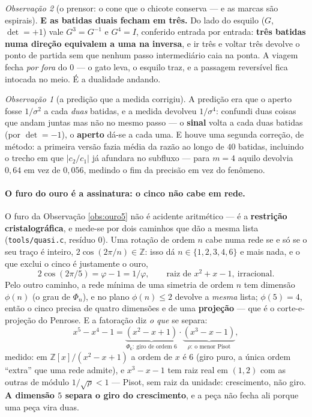 \documentclass[11pt]{article}
\newcommand{\code}[1]{\texttt{\small #1}}
\newcommand{\Z}{\mathbb Z}
\theoremstyle{plain}
\theoremstyle{remark}
\newtheorem{obs}{Observação}
\begin{document}
\begin{obs}[o prensor: o cone que o chicote conserva --- e as marcas são espirais]
\textbf{E as batidas duais fecham em três.} Do lado do esquilo ($G$, $\det=+1$) vale $G^3=G^{-1}$ e
$G^4=I$, conferido entrada por entrada: \textbf{três batidas numa direção equivalem a uma na
inversa}, e ir três e voltar três devolve o ponto de partida sem que nenhum passo intermediário caia
na ponta. A viagem fecha \emph{por fora} do $0$ --- o gato leva, o esquilo traz, e a passagem
reversível fica intocada no meio. É a dualidade andando.

\begin{obs}[a predição que a medida corrigiu]
A predição era que o aperto fosse $1/\sigma^{2}$ a cada \emph{duas} batidas, e a medida devolveu
$1/\sigma^{4}$: confundi duas coisas que andam juntas mas não no mesmo passo --- o \textbf{sinal}
volta a cada duas batidas (por $\det=-1$), o \textbf{aperto} dá-se a cada uma. E houve uma segunda
correção, de método: a primeira versão fazia média da razão ao longo de $40$ batidas, incluindo o
trecho em que $|c_2/c_1|$ já afundara no subfluxo --- para $m=4$ aquilo devolvia $0{,}64$ em vez de
$0{,}056$, medindo o fim da precisão em vez do fenômeno.
\end{obs}
\end{obs}

\paragraph{O furo do ouro é a assinatura: o cinco não cabe em rede.} O furo da Observação
\ref{obs:ouro5} não é acidente aritmético --- é a \textbf{restrição cristalográfica}, e mede-se por
dois caminhos que dão a mesma lista (\code{tools/quasi.c}, resíduo $0$). Uma rotação de ordem $n$ cabe
numa rede se e só se o seu traço é inteiro, $2\cos(2\pi/n)\in\Z$: isso dá $n\in\{1,2,3,4,6\}$ e mais
nada, e o que exclui o cinco é justamente o ouro,
\[
 2\cos(2\pi/5)=\varphi-1=1/\varphi,\qquad\text{raiz de }x^2+x-1,\ \text{irracional.}
\]
Pelo outro caminho, a rede mínima de uma simetria de ordem $n$ tem dimensão $\phi(n)$ (o grau de
$\Phi_n$), e no plano $\phi(n)\le2$ devolve a \emph{mesma} lista; $\phi(5)=4$, então o cinco precisa de
quatro dimensões e de uma \textbf{projeção} --- que é o corte-e-projeção do Penrose. E a fatoração diz
\emph{o que} se separa:
\[
 x^5-x^4-1=\underbrace{(x^2-x+1)}_{\Phi_6:\ \text{giro de ordem }6}\cdot
 \underbrace{(x^3-x-1)}_{\rho:\ \text{o menor Pisot}},
\]
medido: em $\Z[x]/(x^2-x+1)$ a ordem de $x$ é $6$ (giro puro, a única ordem ``extra'' que uma rede
admite), e $x^3-x-1$ tem raiz real em $(1,2)$ com as outras de módulo $1/\sqrt\rho<1$ --- Pisot, sem
raiz da unidade: crescimento, não giro. \textbf{A dimensão $5$ separa o giro do crescimento}, e a peça
não fecha ali porque uma peça vira duas.
\end{document}
